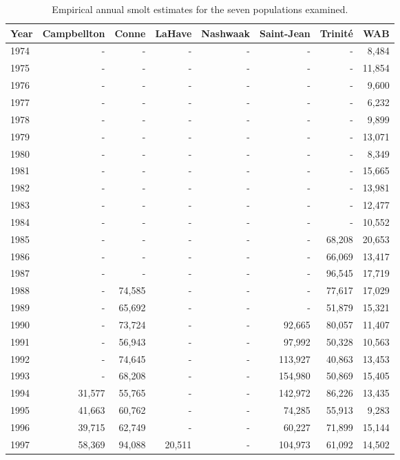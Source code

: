 \begingroup\footnotesize
\begin{longtable}{lrrrrrrr}
\caption{Empirical annual smolt estimates for the seven populations examined.} \\ 
  \hline
Year & Campbellton & Conne & LaHave & Nashwaak & Saint-Jean & Trinité & WAB \\ 
  \hline
1974 & - & - & - & - & - & - & 8,484 \\ 
  1975 & - & - & - & - & - & - & 11,854 \\ 
  1976 & - & - & - & - & - & - & 9,600 \\ 
  1977 & - & - & - & - & - & - & 6,232 \\ 
  1978 & - & - & - & - & - & - & 9,899 \\ 
  1979 & - & - & - & - & - & - & 13,071 \\ 
  1980 & - & - & - & - & - & - & 8,349 \\ 
  1981 & - & - & - & - & - & - & 15,665 \\ 
  1982 & - & - & - & - & - & - & 13,981 \\ 
  1983 & - & - & - & - & - & - & 12,477 \\ 
  1984 & - & - & - & - & - & - & 10,552 \\ 
  1985 & - & - & - & - & - & 68,208 & 20,653 \\ 
  1986 & - & - & - & - & - & 66,069 & 13,417 \\ 
  1987 & - & - & - & - & - & 96,545 & 17,719 \\ 
  1988 & - & 74,585 & - & - & - & 77,617 & 17,029 \\ 
  1989 & - & 65,692 & - & - & - & 51,879 & 15,321 \\ 
  1990 & - & 73,724 & - & - & 92,665 & 80,057 & 11,407 \\ 
  1991 & - & 56,943 & - & - & 97,992 & 50,328 & 10,563 \\ 
  1992 & - & 74,645 & - & - & 113,927 & 40,863 & 13,453 \\ 
  1993 & - & 68,208 & - & - & 154,980 & 50,869 & 15,405 \\ 
  1994 & 31,577 & 55,765 & - & - & 142,972 & 86,226 & 13,435 \\ 
  1995 & 41,663 & 60,762 & - & - & 74,285 & 55,913 & 9,283 \\ 
  1996 & 39,715 & 62,749 & - & - & 60,227 & 71,899 & 15,144 \\ 
  1997 & 58,369 & 94,088 & 20,511 & - & 104,973 & 61,092 & 14,502 \\ 

\end{longtable}
